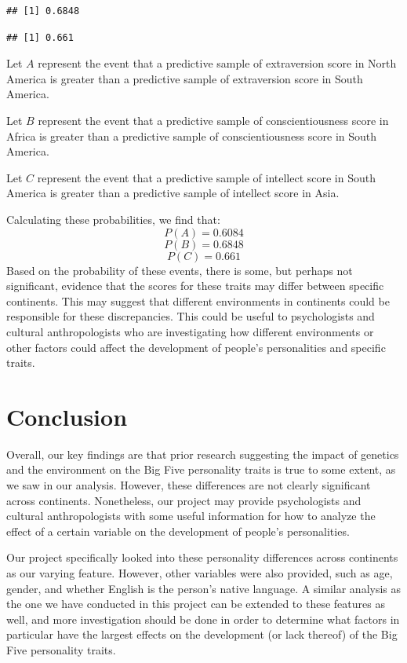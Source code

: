 \documentclass[
]{article}
\begin{document}
\begin{verbatim}
## [1] 0.6848
\end{verbatim}

\begin{verbatim}
## [1] 0.661
\end{verbatim}

Let \(A\) represent the event that a predictive sample of extraversion
score in North America is greater than a predictive sample of
extraversion score in South America.

Let \(B\) represent the event that a predictive sample of
conscientiousness score in Africa is greater than a predictive sample of
conscientiousness score in South America.

Let \(C\) represent the event that a predictive sample of intellect
score in South America is greater than a predictive sample of intellect
score in Asia.

Calculating these probabilities, we find that: \[P(A) = 0.6084\]
\[P(B) = 0.6848\] \[P(C) = 0.661\] Based on the probability of these
events, there is some, but perhaps not significant, evidence that the
scores for these traits may differ between specific continents. This may
suggest that different environments in continents could be responsible
for these discrepancies. This could be useful to psychologists and
cultural anthropologists who are investigating how different
environments or other factors could affect the development of people's
personalities and specific traits.

\hypertarget{conclusion}{%
\section{Conclusion}\label{conclusion}}

Overall, our key findings are that prior research suggesting the impact
of genetics and the environment on the Big Five personality traits is
true to some extent, as we saw in our analysis. However, these
differences are not clearly significant across continents. Nonetheless,
our project may provide psychologists and cultural anthropologists with
some useful information for how to analyze the effect of a certain
variable on the development of people's personalities.

Our project specifically looked into these personality differences
across continents as our varying feature. However, other variables were
also provided, such as age, gender, and whether English is the person's
native language. A similar analysis as the one we have conducted in this
project can be extended to these features as well, and more
investigation should be done in order to determine what factors in
particular have the largest effects on the development (or lack thereof)
of the Big Five personality traits.
\end{document}
